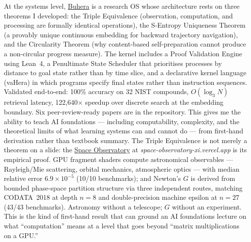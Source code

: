 \documentclass[12pt,a4paper]{article}
\begin{document}
At the systems level, \href{https://github.com/fullscreen-triangle/buhera}{Buhera}
is a research OS whose architecture rests on three theorems I developed: the
Triple Equivalence (observation, computation, and processing are formally identical
operations), the S-Entropy Uniqueness Theorem (a provably unique continuous embedding
for backward trajectory navigation), and the Circularity Theorem (why content-based
self-preparation cannot produce a non-circular progress measure). The kernel includes
a Proof Validation Engine using Lean~4, a Penultimate State Scheduler that prioritises
processes by distance to goal state rather than by time slice, and a declarative
kernel language (vaHera) in which programs specify final states rather than
instruction sequences. Validated end-to-end: 100\% accuracy on 32 NIST compounds,
$O(\log_3 N)$ retrieval latency, 122,640$\times$ speedup over discrete search at
the embedding boundary. Six peer-review-ready papers are in the repository.
This gives me the ability to teach AI foundations --- including computability,
complexity, and the theoretical limits of what learning systems can and cannot do ---
from first-hand derivation rather than textbook summary.
The Triple Equivalence is not merely a theorem on a slide: the
\href{https://space-observatory-xi.vercel.app/}{Space Observatory} at
\textit{space-observatory-xi.vercel.app} is its empirical proof. GPU fragment
shaders compute astronomical observables --- Rayleigh/Mie scattering, orbital
mechanics, atmospheric optics --- with median relative error $6.9 \times 10^{-5}$
(10/10 benchmarks); and Newton's $G$ is derived from bounded phase-space partition
structure via three independent routes, matching CODATA~2018 at depth $n=8$ and
double-precision machine epsilon at $n=27$ (43/43 benchmarks).
Astronomy without a telescope; $G$ without an experiment.
This is the kind of first-hand result that can ground an AI foundations lecture on
what ``computation'' means at a level that goes beyond ``matrix multiplications on
a GPU.''
\end{document}
